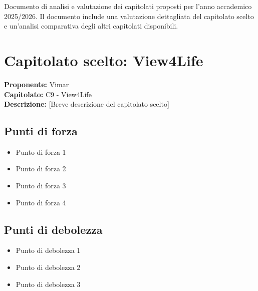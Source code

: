 \documentclass[a4paper,12pt]{article}
\begin{document}
\vspace{0.5cm}

\begin{center}
\begin{tcolorbox}[colback=secondaryblue!10,colframe=secondaryblue,width=0.9\textwidth,arc=3mm,boxrule=0.8pt,title={\bfseries Abstract}]
Documento di analisi e valutazione dei capitolati proposti per l'anno accademico 2025/2026. Il documento include una valutazione dettagliata del capitolato scelto e un'analisi comparativa degli altri capitolati disponibili.
\end{tcolorbox}
\end{center}

\newpage

\renewcommand{\cftsecpagefont}{\normalfont}
\renewcommand{\cftsecleader}{\cftdotfill{\cftsecdotsep}}
\setlength{\cftbeforesecskip}{2pt}
\begin{center}
\begin{tcolorbox}[colback=lightgray,colframe=darkgray,width=0.9\textwidth,arc=2mm,boxrule=0.5pt]
\tableofcontents
\end{tcolorbox}
\end{center}

\newpage

\section{Capitolato scelto: View4Life}

\begin{tcolorbox}[colback=secondaryblue!5,colframe=secondaryblue,arc=2mm,boxrule=0.5pt]
\textbf{Proponente:} Vimar \\
\textbf{Capitolato:} C9 - View4Life \\
\textbf{Descrizione:} [Breve descrizione del capitolato scelto]
\end{tcolorbox}

\subsection{Punti di forza}
\begin{itemize}
\item Punto di forza 1
\item Punto di forza 2
\item Punto di forza 3
\item Punto di forza 4
\end{itemize}

\subsection{Punti di debolezza}
\begin{itemize}
\item Punto di debolezza 1
\item Punto di debolezza 2
\item Punto di debolezza 3
\end{itemize}
\end{document}
